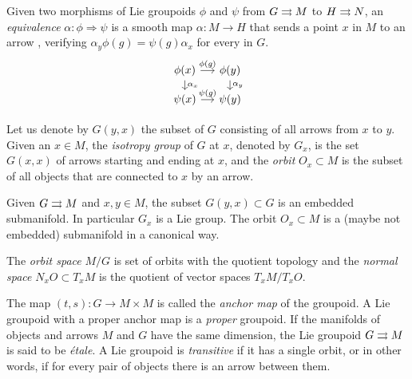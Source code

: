Given two morphisms of Lie groupoids $\phi$ and $\psi$ from $G\rightrightarrows M$ to $H\rightrightarrows N$, an \emph{equivalence} $\alpha\colon\phi\Rightarrow\psi$ is a smooth map $\alpha\colon M\to H$ that sends a point $x$ in $M$ to an arrow , verifying $\alpha_y \phi(g) = \psi(g) \alpha_x$ for every  in $G$.
\begin{equation}
\begin{tikzcd}[sep=small]
  \phi(x) \ar{r}{\phi(g)} \ar{d}{\alpha_x} & \phi(y) \ar{d}{\alpha_y} \\
  \psi(x) \ar{r}{\psi(g)} & \psi(y)
\end{tikzcd}
\end{equation}

Let us denote by $G(y,x)$ the subset of $G$ consisting of all arrows from $x$ to $y$.
Given an $x\in M$, the \emph{isotropy group} of $G$ at $x$, denoted by $G_x$, is the set $G(x,x)$ of arrows starting and ending at $x$,
%
and the \emph{orbit} $O_x\subset M$ is the subset of all objects that are connected to $x$ by an arrow.

\medskip\noi {}

\begin{prop}
Given $G\rightrightarrows M$ and $x,y\in M$, the subset $G(y,x)\subset G$ is an embedded submanifold. In particular $G_x$ is a Lie group. The orbit $O_x\subset M$ is a (maybe not embedded) submanifold in a canonical way. 
\end{prop}

The \emph{orbit space} $M/G$ is set of orbits with the quotient topology
%
and the \emph{normal space} $N_xO\subset T_xM$ is the quotient of vector spaces $T_xM/T_xO$.

The map $(t,s)\colon G\to M\times M$ is called the \emph{anchor map} of the groupoid.
%
A Lie groupoid with a proper anchor map is a \emph{proper} groupoid.
If the manifolds of objects and arrows $M$ and $G$ have the same dimension, the Lie groupoid $G\rightrightarrows M$ is said to be \emph{étale}.
%
A Lie groupoid is \emph{transitive} if it has a single orbit, or in other words, if for every pair of objects there is an arrow  between them.
